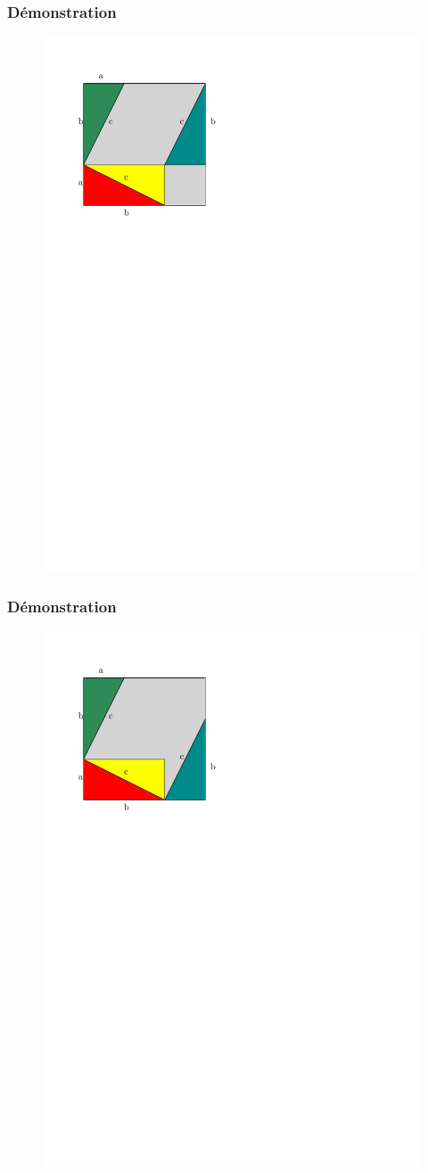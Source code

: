 \documentclass{beamer}
\begin{document}
\begin{frame}
  \frametitle{Démonstration}
 	\begin{figure}[H]
	  \centering
	  \includegraphics[width=0.65\linewidth]{sources/1/demo-pytha-t2.pdf}
	\end{figure}
\end{frame}
\begin{frame}
  \frametitle{Démonstration}
 	\begin{figure}[H]
	  \centering
	  \includegraphics[width=0.65\linewidth]{sources/1/demo-pytha-t3.pdf}
	\end{figure}
\end{frame}
\end{document}
